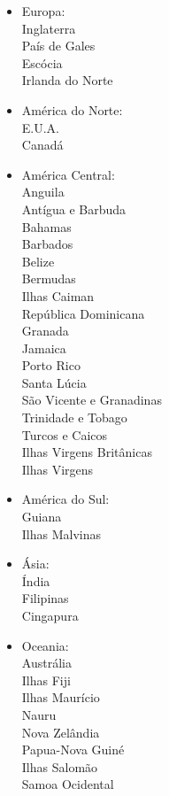 \documentclass[12pt,a4paper]{article} %
\begin{document}
	\begin{itemize}
		\item Europa:\\
			Inglaterra\\
			País de Gales\\
			Escócia\\
			Irlanda do Norte

		\item América do Norte:\\
			E.U.A.\\
			Canadá
		
		\item América Central:\\
			Anguila\\
			Antígua e Barbuda\\
			Bahamas\\
			Barbados\\
			Belize\\
			Bermudas\\
			Ilhas Caiman\\
			República Dominicana\\
			Granada\\
			Jamaica\\
			Porto Rico\\
			Santa Lúcia\\
			São Vicente e Granadinas\\
			Trinidade e Tobago\\
			Turcos e Caicos\\
			Ilhas Virgens Britânicas\\
			Ilhas Virgens
			
		\item América do Sul:\\
			Guiana\\
			Ilhas Malvinas
		
		\item Ásia:\\
			Índia\\
			Filipinas\\
			Cingapura
			
		\item Oceania:\\
			Austrália\\
			Ilhas Fiji\\
			Ilhas Maurício\\
			Nauru\\
			Nova Zelândia\\
			Papua-Nova Guiné\\
			Ilhas Salomão\\
			Samoa Ocidental
		

\end{itemize}
\end{document}
